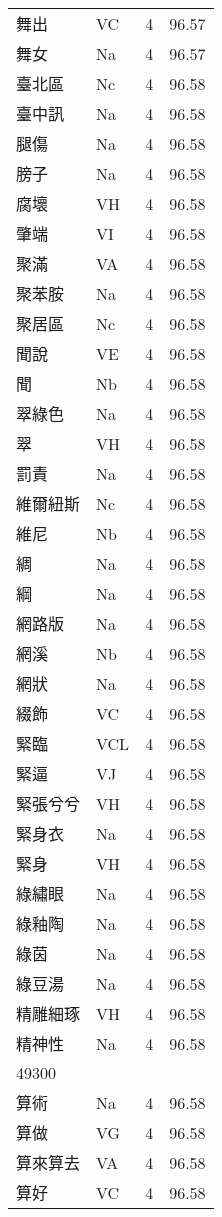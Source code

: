 \documentclass[twocolumn]{book}
\begin{document}
\begin{supertabular}{llrr}
舞出 & VC & 4 &  96.57\\
舞女 & Na & 4 &  96.57\\
臺北區 & Nc & 4 &  96.58\\
臺中訊 & Na & 4 &  96.58\\
腿傷 & Na & 4 &  96.58\\
膀子 & Na & 4 &  96.58\\
腐壞 & VH & 4 &  96.58\\
肇端 & VI & 4 &  96.58\\
聚滿 & VA & 4 &  96.58\\
聚苯胺 & Na & 4 &  96.58\\
聚居區 & Nc & 4 &  96.58\\
聞說 & VE & 4 &  96.58\\
聞 & Nb & 4 &  96.58\\
翠綠色 & Na & 4 &  96.58\\
翠 & VH & 4 &  96.58\\
罰責 & Na & 4 &  96.58\\
維爾紐斯 & Nc & 4 &  96.58\\
維尼 & Nb & 4 &  96.58\\
綢 & Na & 4 &  96.58\\
綱 & Na & 4 &  96.58\\
網路版 & Na & 4 &  96.58\\
網溪 & Nb & 4 &  96.58\\
網狀 & Na & 4 &  96.58\\
綴飾 & VC & 4 &  96.58\\
緊臨 & VCL & 4 &  96.58\\
緊逼 & VJ & 4 &  96.58\\
緊張兮兮 & VH & 4 &  96.58\\
緊身衣 & Na & 4 &  96.58\\
緊身 & VH & 4 &  96.58\\
綠繡眼 & Na & 4 &  96.58\\
綠釉陶 & Na & 4 &  96.58\\
綠茵 & Na & 4 &  96.58\\
綠豆湯 & Na & 4 &  96.58\\
精雕細琢 & VH & 4 &  96.58\\
精神性 & Na & 4 &  96.58\\
49300\\
算術 & Na & 4 &  96.58\\
算做 & VG & 4 &  96.58\\
算來算去 & VA & 4 &  96.58\\
算好 & VC & 4 &  96.58\\

\end{supertabular}
\end{document}

